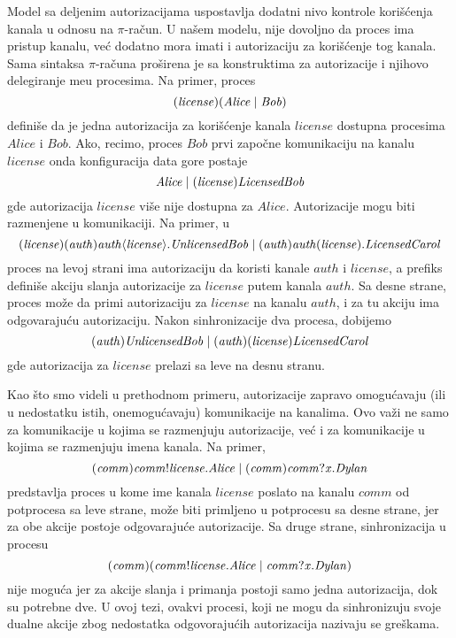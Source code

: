 Model sa deljenim autorizacijama uspostavlja dodatni nivo kontrole kori\v s\' cenja kanala u odnosu na $\pi$-ra\v cun. U na\v sem modelu, nije dovoljno da proces ima pristup kanalu, ve\' c dodatno mora imati i autorizaciju za kori\v s\' cenje tog kanala. Sama sintaksa $\pi$-ra\v cuna pro\v sirena je sa konstruktima za autorizacije i njihovo delegiranje me\dj u procesima. Na primer, proces
\[
    { (\mathit{license}) (\mathit{Alice} \;|\; \mathit{Bob})}
\]
defini\v se da je jedna autorizacija za kori\v s\' cenje kanala $\mathit{license}$ dostupna procesima $\mathit{Alice}$ i $\mathit{Bob}$. Ako, recimo, proces $\mathit{Bob}$ prvi zapo\v cne komunikaciju na kanalu $\mathit{license}$ onda konfiguracija data gore postaje 
$$
 {\mathit{Alice} \;|\; (\mathit{license})\mathit{LicensedBob}}
$$
gde autorizacija $\mathit{license}$ vi\v se nije dostupna za $\mathit{Alice}$. Autorizacije mogu biti razmenjene u komunikaciji. Na primer, u
$$(\mathit{license}) (\mathit{auth})\mathit{auth}\langle\mathit{license}\rangle.\mathit{UnlicensedBob} \;|\; (\mathit{auth})\mathit{auth}(\mathit{license}).\mathit{LicensedCarol}$$
proces na levoj strani ima autorizaciju da koristi kanale $\mathit{auth}$ i $\mathit{license}$, a prefiks defini\v se akciju slanja autorizacije za $\mathit{license}$ putem kanala $\mathit{auth}$. Sa desne strane, proces mo\v ze da primi autorizaciju za $\mathit{license}$ na kanalu $\mathit{auth}$, i za tu akciju ima odgovaraju\' cu autorizaciju. Nakon sinhronizacije dva procesa, dobijemo 
$$ 
(\mathit{auth})\mathit{UnlicensedBob} \;|\; (\mathit{auth})(\mathit{license})\mathit{LicensedCarol}
$$
gde autorizacija za $\mathit{license}$ prelazi sa leve na desnu stranu. 

Kao \v sto smo videli u prethodnom primeru, autorizacije zapravo omogu\' cavaju (ili u nedostatku istih, onemogu\' cavaju) komunikacije na kanalima. Ovo va\v zi ne samo za komunikacije u kojima se razmenjuju autorizacije, ve\' c i za komunikacije u kojima se razmenjuju imena kanala. Na primer, 
$$(\mathit{comm})\mathit{comm}!\mathit{license}.{\mathit{Alice}}
\;|\; (\mathit{comm})\mathit{comm}?\mathit{x}.{\mathit{Dylan}}$$
predstavlja proces u kome ime kanala $\mathit{license}$ poslato na kanalu $\mathit{comm}$ od potprocesa sa leve strane, mo\v ze biti primljeno u potprocesu sa desne strane, jer za obe akcije postoje odgovaraju\' ce autorizacije. Sa druge strane, sinhronizacija u procesu 
$$(\mathit{comm})(\mathit{comm}!\mathit{license}.{\mathit{Alice}}
\;|\; \mathit{comm}?\mathit{x}.{\mathit{Dylan}})$$ 
nije mogu\' ca jer za akcije slanja i primanja postoji samo jedna autorizacija, dok su potrebne dve. U ovoj tezi, ovakvi procesi, koji ne mogu da sinhronizuju svoje dualne akcije zbog nedostatka odgovoraju\' cih autorizacija nazivaju se gre\v skama.  

